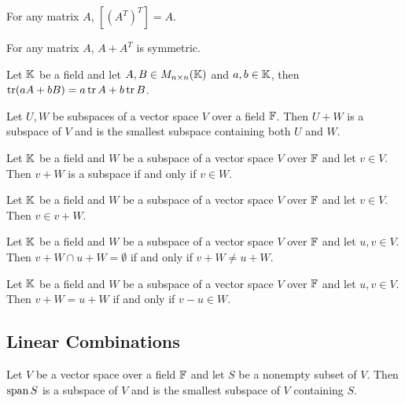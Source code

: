 \begin{proposition}
	For any matrix $A$, $[{(A^T)}^T]=A$.
\end{proposition}

\begin{proposition}
	For any matrix $A$, $A+A^T$ is symmetric.
\end{proposition}

\begin{proposition}
	Let $\mathbb{K}$ be a field and let $A,B\in M_{n\times n}(\mathbb{K})$ and $a,b\in\mathbb{K}$, then $\operatorname{tr} (aA+bB)=a\operatorname{tr} A + b\operatorname{tr} B$.
\end{proposition}

\begin{proposition}
	Let $U,W$ be subspaces of a vector space $V$ over a field $\mathbb{F}$.
	Then $U+W$ is a subspace of $V$ and is the smallest subspace containing both $U$ and $W$.
\end{proposition}

\begin{proposition}
	Let $\mathbb{K}$ be a field and $W$ be a subspace of a vector space $V$ over $\mathbb{F}$ and let $v\in V$.
	Then $v+W$ is a subspace if and only if $v\in W$.
\end{proposition}

\begin{proposition}
	Let $\mathbb{K}$ be a field and $W$ be a subspace of a vector space $V$ over $\mathbb{F}$ and let $v\in V$.
	Then $v\in v+W$.
\end{proposition}

\begin{proposition}
	Let $\mathbb{K}$ be a field and $W$ be a subspace of a vector space $V$ over $\mathbb{F}$ and let $u,v\in V$.
	Then $v+W\cap u+W=\emptyset$ if and only if $v+W\neq u+W$.
\end{proposition}

\begin{proposition}
	Let $\mathbb{K}$ be a field and $W$ be a subspace of a vector space $V$ over $\mathbb{F}$ and let $u,v\in V$.
	Then $v+W=u+W$ if and only if $v-u\in W$.
\end{proposition}

\pagebreak

\subsection{Linear Combinations}

\begin{thm}
	Let $V$ be a vector space over a field $\mathbb{F}$ and let $S$ be a nonempty subset of $V$.
	Then $\operatorname{span} S$ is a subspace of $V$ and is the smallest subspace of $V$ containing $S$.
\end{thm}


